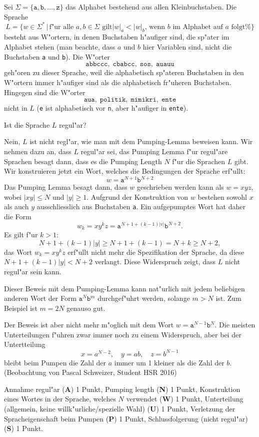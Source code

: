 Sei $\Sigma=\{\texttt{a},\texttt{b},\dots,\texttt{z}\}$ das Alphabet
bestehend aus allen Kleinbuchstaben. Die Sprache
\[
L=\{ w\in\Sigma^*
\,
|\,
\text{
f"ur alle $a,b\in\Sigma$ gilt
$|w|_a < |w|_b$, wenn $b$ im Alphabet auf $a$ folgt%
}
\}
\]
besteht aus W"ortern, in denen Buchstaben h"aufiger sind, die sp"ater im
Alphabet stehen (man beachte, dass $a$ und $b$ hier Variablen sind,
nicht die Buchstaben \texttt{a} und \texttt{b}).
Die W"orter
\[
\texttt{abbccc},\;
\texttt{cbabcc},\;
\texttt{sos},\;
\texttt{auauu}
\]
geh"oren zu dieser Sprache, weil die alphabetisch sp"ateren Buchstaben
in den W"ortern immer h"aufiger sind als die alphabetisch
fr"uheren Buchstaben. Hingegen sind die W"orter 
\[
\texttt{aua},\;
\texttt{politik},\;
\texttt{mimikri},\;
\texttt{ente}
\]
nicht in $L$ (\texttt{e} ist alphabetisch vor \texttt{n}, aber h"aufiger
in \texttt{ente}).

Ist die Sprache $L$ regul"ar?

\begin{loesung}
Nein, $L$ ist nicht regl"ar, wie man mit dem Pumping-Lemma beweisen kann.
Wir nehmen dazu an, dass $L$ regul"ar sei, das Pumping Lemma f"ur
regul"are Sprachen besagt dann, dass es die Pumping Length $N$ f"ur die
Sprachen $L$ gibt.
Wir konstruieren jetzt ein Wort, welches die Bedingungen der Sprache
erf"ullt:
\[
w=\texttt{a}^{N+1}\texttt{b}^{N+2}
\]
Das Pumping Lemma besagt dann, dass $w$ geschrieben werden kann als
$w=xyz$, wobei $|xy|\le N$ und $|y|\ge 1$. 
Aufgrund der Konstruktion von $w$ bestehen sowohl $x$ als auch $y$
ausschliesslich aus Buchstaben \texttt{a}.
Ein aufgepumptes Wort hat daher die Form
\[
w_k=xy^kz = \texttt{a}^{N+1+(k-1)|v|}\texttt{b}^{N+2}.
\]
Es gilt f"ur $k > 1$:
\[
N+1+(k-1)|y|\ge N+1+(k-1)=N+k\ge N+2,
\]
das Wort $w_k=xy^kz$ erf"ullt nicht mehr die Spezifikation der Sprache,
da diese $N+1+(k-1)|y| < N+2$ verlangt.
Diese Widerspruch zeigt, dass $L$ nicht regul"ar sein kann.
\end{loesung}

\begin{diskussion}
Dieser Beweis mit dem Pumping-Lemma kann nat"urlich mit jedem beliebigen
anderen Wort der Form $\texttt{a}^N\texttt{b}^{m}$ durchgef"uhrt werden,
solange $m > N$ ist. Zum Beispiel ist $m=2N$ genauso gut.

Der Beweis ist aber nicht mehr m"oglich mit dem Wort
$w=\texttt{a}^{N-1}\texttt{b}^N$.
Die meisten Unterteilungen f"uhren zwar immer noch zu einem
Widerspruch, aber bei der Untertteilung
\[
x = a^{N-2}, \quad y=ab, \quad z= b^{N-1}
\]
bleibt beim Pumpen die Zahl der $a$ immer um 1 kleiner als
die Zahl der $b$.
(Beobachtung von Pascal Schweizer, Student HSR 2016)
\end{diskussion}

\begin{bewertung}
Annahme regul"ar ({\bf A}) 1 Punkt,
Pumping length ({\bf N}) 1 Punkt,
Konstruktion eines Wortes in der Sprache, welches $N$ verwendet ({\bf W})
1 Punkt,
Unterteilung (allgemein, keine willk"urliche/spezielle Wahl) ({\bf U}) 1 Punkt,
Verletzung der Spracheigenschaft beim Pumpen ({\bf P}) 1 Punkt,
Schluss\-folgerung (nicht regul"ar) ({\bf S}) 1 Punkt.
\end{bewertung}
 
